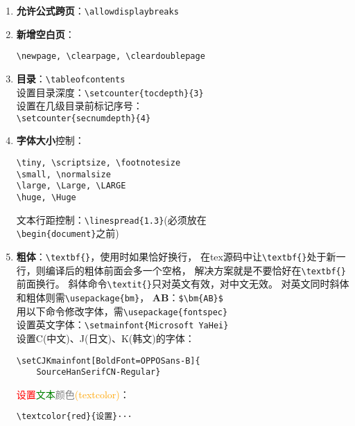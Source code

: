 \documentclass{article}
\renewcommand{\today}{\number\year-\number\month-\number\day}
\begin{document}
\begin{multicols}{2}
\begin{enumerate}
\begin{lstlisting}
\footnotetext{\scriptsize#1}
\renewcommand{\thefootnote}{
\ding{\numexpr171+\value{footnote}}}}    
\end{lstlisting}


        \item \textbf{允许公式跨页}：\verb|\allowdisplaybreaks|

        \item \textbf{新增空白页}：
              \begin{lstlisting}
\newpage, \clearpage, \cleardoublepage
\end{lstlisting}


        \item \textbf{目录}：\verb|\tableofcontents| \\
              设置目录深度：\verb|\setcounter{tocdepth}{3}| \\
              设置在几级目录前标记序号：\\
              \verb|\setcounter{secnumdepth}{4}|

        \item \textbf{字体大小}控制：
              \begin{lstlisting}
\tiny, \scriptsize, \footnotesize
\small, \normalsize
\large, \Large, \LARGE
\huge, \Huge    
\end{lstlisting}

              文本行距控制：\verb|\linespread{1.3}|(必须放在\\
              \verb|\begin{document}|之前)

        \item \textbf{粗体}：\verb|\textbf{}|，使用时如果恰好换行，
              在tex源码中让\verb|\textbf{}|处于新一行，则编译后的粗体前面会多一个空格，
              解决方案就是不要恰好在\verb|\textbf{}|前面换行。
              斜体命令\verb|\textit{}|只对英文有效，对中文无效。
              对英文同时斜体和粗体则需\verb|\usepackage{bm}|，
              $ \bm{AB} $：\verb|$\bm{AB}$| \\
              用以下命令修改字体，需\verb|\usepackage{fontspec}|\\
              设置英文字体：\verb|\setmainfont{Microsoft YaHei}|\\
              设置C(中文)、J(日文)、K(韩文)的字体：
              \begin{lstlisting}
\setCJKmainfont[BoldFont=OPPOSans-B]{
    SourceHanSerifCN-Regular}
\end{lstlisting}
              \textcolor{red}{设置}\textcolor{green}{文本}\textcolor{gray}{颜色}\textcolor{orange}{(textcolor)}：
              \begin{lstlisting}
\textcolor{red}{设置}···
\end{lstlisting}



\end{enumerate}
\end{multicols}
\end{document}
